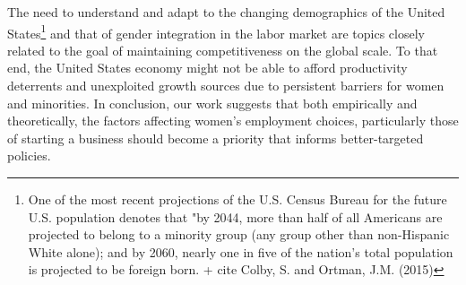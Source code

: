 The need to understand and adapt to the changing demographics of the United States\footnote{One of the most recent projections of the U.S. Census Bureau for the future U.S. population denotes that "by 2044, more than half of all Americans are projected to belong to a minority group (any group other than non-Hispanic White alone); and by 2060, nearly one in five of the nation's total population is projected to be foreign born. + cite Colby, S. and Ortman, J.M. (2015)} and that of gender integration in the labor market are topics closely related to the goal of maintaining competitiveness on the global scale. To that end, the United States economy might not be able to afford productivity deterrents and unexploited growth sources due to persistent barriers for women and minorities. In conclusion, our work suggests that both empirically and theoretically, the factors affecting women's employment choices, particularly those of starting a business should become a priority that informs better-targeted policies. 